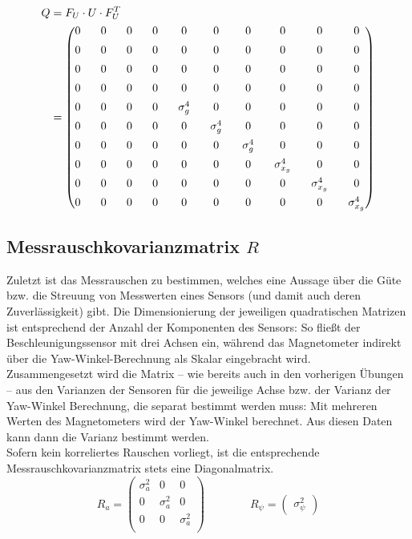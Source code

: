 \documentclass[12pt,a4paper]{article}
\begin{document}
		\begin{equation}
			\begin{split}
					Q&=F_{U}\cdot U\cdot F_{U}^{T}\\
					&=
					\setlength{\arraycolsep}{9pt}
					\begin{pmatrix}
					0 & 0 & 0 & 0 & 0 & 0 & 0 & 0 & 0 & 0 \\[0.5em]
					0 & 0 & 0 & 0 & 0 & 0 & 0 & 0 & 0 & 0 \\[0.5em]
					0 & 0 & 0 & 0 & 0 & 0 & 0 & 0 & 0 & 0 \\[0.5em]
					0 & 0 & 0 & 0 & 0 & 0 & 0 & 0 & 0 & 0 \\[0.5em]
					0 & 0 & 0 & 0 & \sigma_{g}^{4} & 0 & 0 & 0 & 0 & 0 \\[0.5em]
					0 & 0 & 0 & 0 & 0 & \sigma_{g}^{4} & 0 & 0 & 0 & 0 \\[0.5em]
					0 & 0 & 0 & 0 &0  & 0 & \sigma_{g}^{4} & 0 & 0 & 0 \\[0.5em]
					0 & 0 & 0 & 0 & 0 & 0 & 0 & \sigma_{x_{g}}^{4} & 0 & 0 \\[0.5em]
					0 & 0 & 0 & 0 & 0 & 0 & 0 & 0 & \sigma_{x_{g}}^{4} & 0 \\[0.5em]
					0 & 0 & 0 & 0 & 0 & 0 & 0 & 0 & 0 & \sigma_{x_{g}}^{4}
				\end{pmatrix}
			\end{split}
		\end{equation}
		\subsection{Messrauschkovarianzmatrix $R$}
		Zuletzt ist das Messrauschen zu bestimmen, welches eine Aussage über die Güte bzw. die Streuung von Messwerten eines Sensors (und damit auch deren Zuverlässigkeit) gibt. Die Dimensionierung der jeweiligen quadratischen Matrizen ist entsprechend der Anzahl der Komponenten des Sensors: So fließt der Beschleunigungssensor mit drei Achsen ein, während das Magnetometer indirekt über die Yaw-Winkel-Berechnung als Skalar eingebracht wird.\\
		Zusammengesetzt wird die Matrix -- wie bereits auch in den vorherigen Übungen -- aus den Varianzen der Sensoren für die jeweilige Achse bzw. der Varianz der Yaw-Winkel Berechnung, die separat bestimmt werden muss: Mit mehreren Werten des Magnetometers wird der Yaw-Winkel berechnet. Aus diesen Daten kann dann die Varianz bestimmt werden.\\
		Sofern kein korreliertes Rauschen vorliegt, ist die entsprechende Messrauschkovarianzmatrix stets eine Diagonalmatrix.  
		\begin{equation}
			R_{a}=
			\begin{pmatrix}
			\sigma_{a}^{2} & 0 & 0 \\[0.5em]
			0 & \sigma_{a}^{2} & 0 \\[0.5em]
			0 & 0 & \sigma_{a}^{2}\\
			\end{pmatrix}\qquad\qquad
			R_{\psi}=
			\begin{pmatrix}
			\sigma_{\psi}^{2}
			\end{pmatrix}
		\end{equation}
\end{document}
